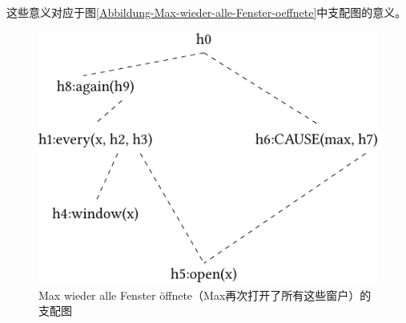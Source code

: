 \noindent
这些意义对应于图\vref{Abbildung-Max-wieder-alle-Fenster-oeffnete}中支配图的意义。
\begin{figure}
\centering

\includegraphics{Figures/mrs-max-wieder-alle-fenster-oeffnete-cropped.pdf}
\caption{Max wieder alle Fenster öffnete（Max再次打开了所有这些窗户）\label{Abbildung-Max-wieder-alle-Fenster-oeffnete}的支配图}
\end{figure}%
